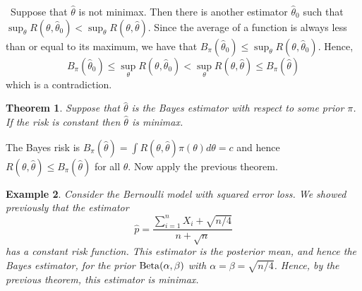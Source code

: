 \documentclass[twoside,12pt]{article}
\newcounter{lecnum}
\newtheorem{theorem}{Theorem}[lecnum]
\newtheorem{example}[theorem]{Example}
\begin{document}
\proof
~Suppose that $\widehat\theta$ is not minimax.
Then there is another estimator $\widehat{\theta}_0$ such that
$\sup_\theta R(\theta, \widehat{\theta}_0) < \sup_\theta R(\theta,\widehat\theta)$.
Since the average of a function is always less than or equal to its maximum,
we have that
$B_\pi(\widehat{\theta}_0)\leq \sup_\theta R(\theta,\widehat{\theta}_0)$.
Hence,
\begin{equation}
B_\pi(\widehat{\theta}_0)  \leq \sup_\theta R(\theta,\widehat{\theta}_0) <
\sup_\theta R(\theta,\widehat\theta) \leq
 B_\pi(\widehat\theta)
\end{equation}
which is a contradiction. 


\begin{theorem}
Suppose that $\widehat{\theta}$ is the Bayes estimator with respect to some prior $\pi$.
If the risk is constant
then $\widehat{\theta}$ is minimax.
\end{theorem}


\proof
The Bayes risk is
$B_\pi(\widehat{\theta}) = \int R(\theta,\widehat{\theta})  \pi(\theta)d\theta =c$
and hence
$R(\theta,\widehat{\theta}) \leq B_\pi(\widehat{\theta})$ for all $\theta$.
Now apply the previous theorem. 

\begin{example}\label{ex::binomial-minimax}
Consider the Bernoulli model with squared error loss.
We showed previously that the estimator
$$
\widehat{p} = \frac{\sum_{i=1}^nX_i + \sqrt{n/4}}{n+ \sqrt{n}}
$$
has a constant risk function.
This estimator is the posterior mean, and hence the Bayes estimator,
for the prior ${\rm Beta} (\alpha,\beta)$ with
$\alpha = \beta = \sqrt{n/4}$. Hence, by the previous theorem, 
this estimator is minimax.
\end{example}

\end{document}
